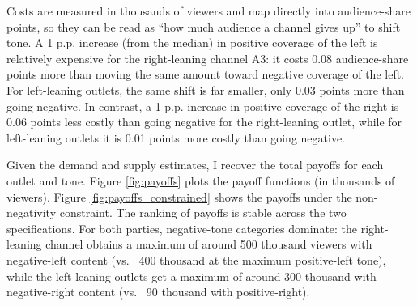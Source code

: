 \documentclass[12pt]{article}
\begin{document}
	
	
	Costs are measured in thousands of viewers and map directly into audience-share points, so they can be read as “how much audience a channel gives up” to shift tone. A 1 p.p. increase (from the median) in positive coverage of the left is relatively expensive for the right-leaning channel A3: it costs 0.08 audience-share points more than moving the same amount toward negative coverage of the left. For left-leaning outlets, the same shift is far smaller, only 0.03 points more than going negative. In contrast, a 1 p.p. increase in positive coverage of the right is 0.06 points less costly than going negative for the right-leaning outlet, while for left-leaning outlets it is 0.01 points more costly than going negative. 
	
	
	
	Given the demand and supply estimates, I recover the total payoffs for each outlet and tone.  Figure \ref{fig:payoffs} plots the payoff functions (in thousands of viewers). Figure \ref{fig:payoffs_constrained} shows the payoffs under the non-negativity constraint. The ranking of payoffs is stable across the two specifications. For both parties, negative-tone categories dominate: the right-leaning channel obtains a maximum of  around 500 thousand viewers with negative-left content (vs. ~400 thousand at the maximum positive-left tone), while the left-leaning outlets get a maximum of around 300 thousand with negative-right content (vs. ~90 thousand with positive-right).
	
	
	
	
	
	
\end{document}
